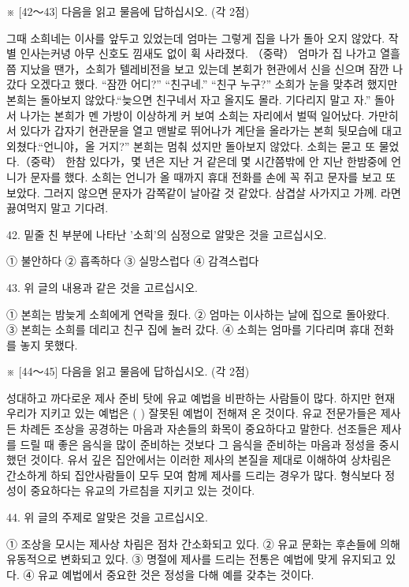 \documentclass[12pt]{article}
\begin{document}
\begin{enumerate}[1.]
※ [42～43] 다음을 읽고 물음에 답하십시오. (각 2점)

  그때 소희네는 이사를 앞두고 있었는데 엄마는 그렇게 집을 나가 돌아
오지 않았다. 작별 인사는커녕 아무 신호도 낌새도 없이 휙 사라졌다. （중략）
엄마가 집 나가고 열흘쯤 지났을 땐가，소희가 텔레비전을 보고 있는데
본회가 현관에서 신을 신으며 잠깐 나갔다 오겠다고 했다.
  “잠깐 어디?” “친구네.” “친구 누구?” 소희가 눈을 맞추려 했지만 본희는
돌아보지 않았다.“늦으면 친구네서 자고 올지도 몰라. 기다리지 말고 자.”
돌아서 나가는 본희가 멘 가방이 이상하게 커 보여 소희는 자리에서 벌떡
일어났다. 가만히 서 있다가 갑자기 현관문을 열고 맨발로 뛰어나가 계단을
올라가는 본희 뒷모습에 대고 외쳤다.“언니야，올 거지?” 본희는 멈춰
섰지만 돌아보지 않았다. 소희는 묻고 또 물었다.（중략）
   한참 있다가，몇 년은 지난 거 같은데 몇 시간쯤밖에 안 지난 한밤중에
언니가 문자를 했다. 소희는 언니가 올 때까지 휴대 전화를 손에 꼭 쥐고
문자를 보고 또 보았다. 그러지 않으면 문자가 감쪽같이 날아갈 것 같았다.
   삼겹살 사가지고 가께. 라면 끓여먹지 말고 기다려.


42. 밑줄 친 부분에 나타난 '소희'의 심정으로 알맞은 것을 고르십시오.

① 불안하다	② 흡족하다
③ 실망스럽다	④ 감격스럽다


43. 위 글의 내용과 같은 것을 고르십시오.

① 본희는 밤늦게 소희에게 연락을 줬다.
② 엄마는 이사하는 날에 집으로 돌아왔다.
③ 본희는 소희를 데리고 친구 집에 놀러 갔다.
④ 소희는 엄마를 기다리며 휴대 전화를 놓지 못했다.




※ [44～45] 다음을 읽고 물음에 답하십시오. (각 2점)

  성대하고 까다로운 제사 준비 탓에 유교 예법을 비판하는 사람들이
많다. 하지만 현재 우리가 지키고 있는 예법은 (      ) 잘못된
예법이 전해져 온 것이다. 유교 전문가들은 제사든 차례든 조상을 공경하는
마음과 자손들의 화목이 중요하다고 말한다. 선조들은 제사를 드릴 때
좋은 음식을 많이 준비하는 것보다 그 음식을 준비하는 마음과 정성을
중시했던 것이다. 유서 깊은 집안에서는 이러한 제사의 본질을 제대로
이해하여 상차림은 간소하게 하되 집안사람들이 모두 모여 함께 제사를
드리는 경우가 많다. 형식보다 정성이 중요하다는 유교의 가르침을 지키고
있는 것이다.


44. 위 글의 주제로 알맞은 것을 고르십시오.

① 조상을 모시는 제사상 차림은 점차 간소화되고 있다.
② 유교 문화는 후손들에 의해 유동적으로 변화되고 있다.
③ 명절에 제사를 드리는 전통은 예법에 맞게 유지되고 있다.
④ 유교 예법에서 중요한 것은 정성을 다해 예를 갖추는 것이다.



\end{enumerate}
\end{document}
